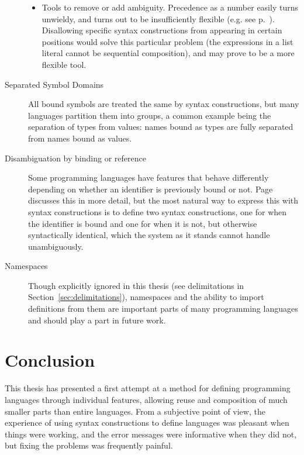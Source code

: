 \documentclass{kththesis}
\begin{document}
\begin{description}
\begin{itemize}
    \item Tools to remove or add ambiguity. Precedence as a number easily turns unwieldy, and turns out to be insufficiently flexible (e.g. see p.~\pageref{sec:ambiguous-lists}). Disallowing specific syntax constructions from appearing in certain positions would solve this particular problem (the expressions in a list literal cannot be sequential composition), and may prove to be a more flexible tool.
  \end{itemize}

  \item[Separated Symbol Domains] All bound symbols are treated the same by syntax constructions, but many languages partition them into groups, a common example being the separation of types from values: names bound as types are fully separated from names bound as values. %

  \item[Disambiguation by binding or reference] Some programming languages have features that behave differently depending on whether an identifier is previously bound or not. Page~\pageref{sec:prolog-pattern-matching} discusses this in more detail, but the most natural way to express this with syntax constructions is to define two syntax constructions, one for when the identifier is bound and one for when it is not, but otherwise syntactically identical, which the system as it stands cannot handle unambiguously.

  \item[Namespaces] Though explicitly ignored in this thesis (see delimitations in Section~\ref{sec:delimitations}), namespaces and the ability to import definitions from them are important parts of many programming languages and should play a part in future work.
\end{description}

\section{Conclusion}

This thesis has presented a first attempt at a method for defining programming languages through individual features, allowing reuse and composition of much smaller parts than entire languages. From a subjective point of view, the experience of using syntax constructions to define languages was pleasant when things were working, and the error messages were informative when they did not, but fixing the problems was frequently painful.
\end{document}
